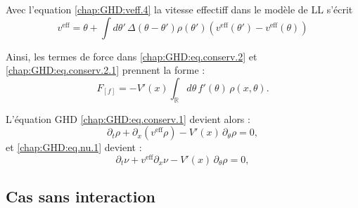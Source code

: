 Avec l'equation \eqref{chap:GHD:veff.4} la vitesse effectiff dans le modèle de LL s'écrit 
\begin{equation}
	v^{\mathrm{eff}} = \theta +	\int d \theta' \, \Delta(\theta - \theta') \rho ( \theta') ( v^{\mathrm{eff}} ( \theta' ) - v^{\mathrm{eff}} ( \theta )  ) 
\end{equation}


Ainsi, les termes de force dans \eqref{chap:GHD:eq.conserv.2} et \eqref{chap:GHD:eq.conserv.2.1} prennent la forme :
\begin{equation}
	F_{[f]} = -V'(x) \int_{\mathbb{R}} d\theta \, f'(\theta) \, \rho(x, \theta).
\end{equation}

L’équation GHD \eqref{chap:GHD:eq.conserv.1} devient alors :
\begin{equation}\label{chap:GHD:eq.conserv.3.1}
	\partial_t \rho + \partial_x\!\left(v^{\mathrm{eff}} \rho\right) - V'(x) \, \partial_\theta \rho = 0,
\end{equation}
et \eqref{chap:GHD:eq.nu.1} devient :
\begin{equation}\label{chap:GHD:eq.nu.1.1}
	\partial_t \nu + v^{\mathrm{eff}}\partial_x \nu - V'(x) \, \partial_\theta \rho = 0,
\end{equation}



\subsection{Cas sans interaction}

